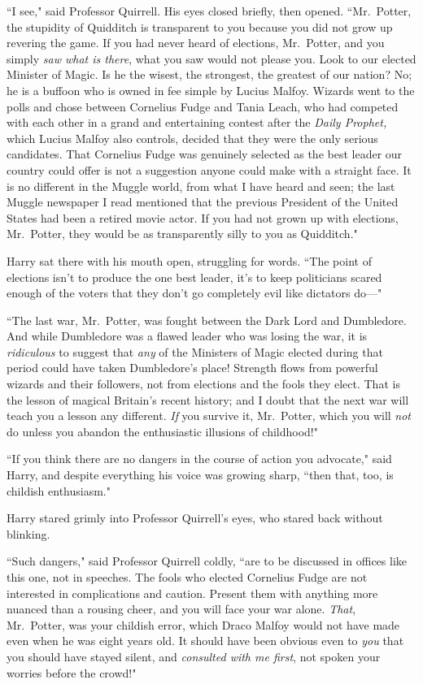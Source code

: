 ``I see," said Professor Quirrell. His eyes closed briefly, then opened. ``Mr.~Potter, the stupidity of Quidditch is transparent to you because you did not grow up revering the game. If you had never heard of elections, Mr.~Potter, and you simply \emph{saw what is there}, what you saw would not please you. Look to our elected Minister of Magic. Is he the wisest, the strongest, the greatest of our nation? No; he is a buffoon who is owned in fee simple by Lucius Malfoy. Wizards went to the polls and chose between Cornelius Fudge and Tania Leach, who had competed with each other in a grand and entertaining contest after the \emph{Daily Prophet,} which Lucius Malfoy also controls, decided that they were the only serious candidates. That Cornelius Fudge was genuinely selected as the best leader our country could offer is not a suggestion anyone could make with a straight face. It is no different in the Muggle world, from what I have heard and seen; the last Muggle newspaper I read mentioned that the previous President of the United States had been a retired movie actor. If you had not grown up with elections, Mr.~Potter, they would be as transparently silly to you as Quidditch."

Harry sat there with his mouth open, struggling for words. ``The point of elections isn't to produce the one best leader, it's to keep politicians scared enough of the voters that they don't go completely evil like dictators do—"

``The last war, Mr.~Potter, was fought between the Dark Lord and Dumbledore. And while Dumbledore was a flawed leader who was losing the war, it is \emph{ridiculous} to suggest that \emph{any} of the Ministers of Magic elected during that period could have taken Dumbledore's place! Strength flows from powerful wizards and their followers, not from elections and the fools they elect. That is the lesson of magical Britain's recent history; and I doubt that the next war will teach you a lesson any different. \emph{If} you survive it, Mr.~Potter, which you will \emph{not} do unless you abandon the enthusiastic illusions of childhood!"

``If you think there are no dangers in the course of action you advocate," said Harry, and despite everything his voice was growing sharp, ``then that, too, is childish enthusiasm."

Harry stared grimly into Professor Quirrell's eyes, who stared back without blinking.

``Such dangers," said Professor Quirrell coldly, ``are to be discussed in offices like this one, not in speeches. The fools who elected Cornelius Fudge are not interested in complications and caution. Present them with anything more nuanced than a rousing cheer, and you will face your war alone. \emph{That}, Mr.~Potter, was your childish error, which Draco Malfoy would not have made even when he was eight years old. It should have been obvious even to \emph{you} that you should have stayed silent, and \emph{consulted with me first}, not spoken your worries before the crowd!"

